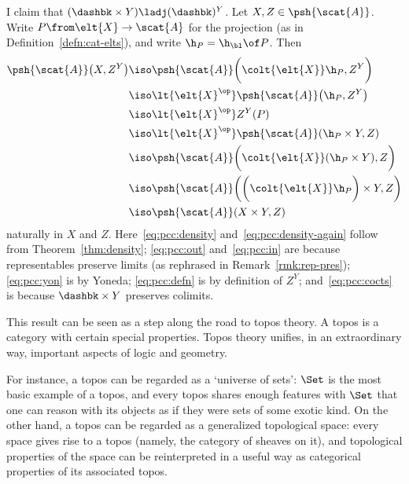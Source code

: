 \begin{pf}
I claim that $(\dashbk \times Y) \ladj (\dashbk)^Y$.  Let $X, Z \in
\psh{\scat{A}}$.  Write $P\from \elt{X} \to \scat{A}$ for the projection
(as in Definition~\ref{defn:cat-elts}), and write $\h_P = \h_\bl \of P$.
Then
% 
\begin{align}
\label{eq:pcc:density}
\psh{\scat{A}}\bigl(X, Z^Y\bigr) &
\iso   
\psh{\scat{A}} \biggl( \colt{\elt{X}} \h_P, Z^Y \biggr)  \\      
\label{eq:pcc:out}
        &
\iso   
\lt{\elt{X}^{\op}} \psh{\scat{A}}\bigl(\h_P, Z^Y\bigr)   \\
\label{eq:pcc:yon}
        &
\iso   
\lt{\elt{X}^{\op}} Z^Y(P)                       \\
\label{eq:pcc:defn}
        &
\iso   
\lt{\elt{X}^{\op}} \psh{\scat{A}}(\h_P \times Y, Z)     \\
\label{eq:pcc:in}
        &
\iso   
\psh{\scat{A}}\biggl( \colt{\elt{X}} (\h_P \times Y), Z \biggr) \\
\label{eq:pcc:cocts} 
       &
\iso   
\psh{\scat{A}}\biggl(\biggl(\colt{\elt{X}} \h_P\biggr) \times Y, Z\biggr) \\
\label{eq:pcc:density-again}
        &
\iso   
\psh{\scat{A}}(X \times Y, Z)
\end{align}
% 
naturally in $X$ and $Z$.  Here~\eqref{eq:pcc:density}
and~\eqref{eq:pcc:density-again} follow from Theorem~\ref{thm:density};
\eqref{eq:pcc:out} and~\eqref{eq:pcc:in} are because representables
preserve limits (as rephrased in Remark~\ref{rmk:rep-pres});
\eqref{eq:pcc:yon} is by Yoneda; \eqref{eq:pcc:defn} is by definition of
$Z^Y$; and~\eqref{eq:pcc:cocts} is because $\dashbk\times Y$ preserves
colimits.
\end{pf}

This result can be seen as a step along the road to topos%
%
%
theory.  A topos is a category with certain special properties.  Topos
theory unifies, in an extraordinary way, important aspects of logic and
geometry.

For instance, a topos can be regarded as a `universe of sets':%
%
%
$\Set$ is the most basic example of a topos, and every topos shares enough
features with $\Set$ that one can reason with its objects as if they were
sets of some exotic kind.  On the other hand, a topos can be regarded as a
generalized topological space:%
%
%
every space gives rise to a topos (namely, the category of sheaves%
%
%
on it), and topological properties of the space can be reinterpreted in a
useful way as categorical properties of its associated topos.

